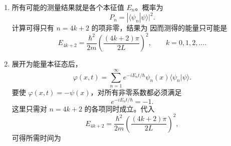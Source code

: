 \begin{question}
\begin{solution}
\begin{enumerate}[label=(\arabic*),leftmargin=2.5em]
  \item 所有可能的测量结果就是各个本征值 $E_n$。概率为
  \[
  P_n=|\langle \psi_n|\psi\rangle|^2.
  \]
  计算可得只有 $n=4k+2$ 的项非零，结果为
  因而测得的能量只可能是
  \[
  E_{4k+2}=\frac{\hbar^2}{2m}\left(\frac{(4k+2)\pi}{2L}\right)^2,
  \qquad k=0,1,2,\dots.
  \]

  \item 展开为能量本征态后，
  \[
  \varphi(x,t)=\sum_{n=1}^{\infty}e^{-iE_nt/\hbar}\psi_n(x)\langle \psi_n|\psi\rangle.
  \]
  要使 $\varphi(x,t)=-\psi(x)$，对所有非零系数都必须满足
  \[
  e^{-iE_nt/\hbar}=-1.
  \]
  这里只需对 $n=4k+2$ 的各项同时成立。代入
  \[
  E_{4k+2}=\frac{\hbar^2}{2m}\left(\frac{(4k+2)\pi}{2L}\right)^2,
  \]
  可得所需时间为
\end{enumerate}
\end{solution}
\end{question}

